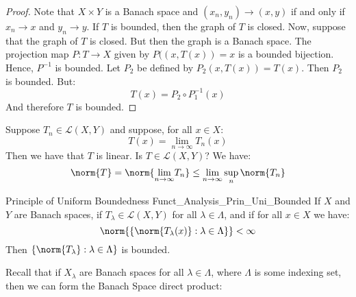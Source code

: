         \begin{proof}
            Note that $X\times{Y}$ is a Banach space and
            $(x_{n},y_{n})\rightarrow(x,y)$ if and only if
            $x_{n}\rightarrow{x}$ and $y_{n}\rightarrow{y}$.
            If $T$ is bounded, then the graph of $T$ is closed.
            Now, suppose that the graph of $T$ is closed. But
            then the graph is a Banach space. The projection map
            $P:T\rightarrow{X}$ given by $P((x,T(x))=x$ is
            a bounded bijection. Hence, $P^{\minus{1}}$ is bounded.
            Let $P_{2}$ be defined by $P_{2}(x,T(x))=T(x)$. Then
            $P_{2}$ is bounded. But:
            \begin{equation}
                T(x)=P_{2}\circ{P}_{1}^{\minus{1}}(x)
            \end{equation}
            And therefore $T$ is bounded.
        \end{proof}
        \begin{lexample}
            Suppose $T_{n}\in\mathcal{L}(X,Y)$ and suppose, for
            all $x\in{X}$:
            \begin{equation}
                T(x)=\underset{n\rightarrow\infty}{\lim}T_{n}(x)
            \end{equation}
            Then we have that $T$ is linear. Is
            $T\in\mathcal{L}(X,Y)$? We have:
            \begin{equation}
                \norm{T}=
                \norm{\underset{n\rightarrow\infty}{\lim}T_{n}}
                \leq\underset{n\rightarrow\infty}{\lim}\sup_{n}
                \norm{T_{n}}
            \end{equation}
        \end{lexample}
        \begin{ltheorem}{Principle of Uniform Boundedness}
              {Funct_Analysis_Prin_Uni_Bounded}
            If $X$ and $Y$ are Banach spaces, if
            $T_{\lambda}\in\mathcal{L}(X,Y)$ for all
            $\lambda\in\Lambda$, and if for all $x\in{X}$ we have:
            \begin{equation}
                \norm{\{\norm{T_{\lambda}(x)}:\lambda\in\Lambda\}}
                <\infty
            \end{equation}
            Then $\{\norm{T_{\lambda}}:\lambda\in\Lambda\}$ is
            bounded.
        \end{ltheorem}
        Recall that if $X_{\lambda}$ are Banach spaces for all
        $\lambda\in\Lambda$, where $\Lambda$ is some indexing
        set, then we can form the Banach Space direct product:
